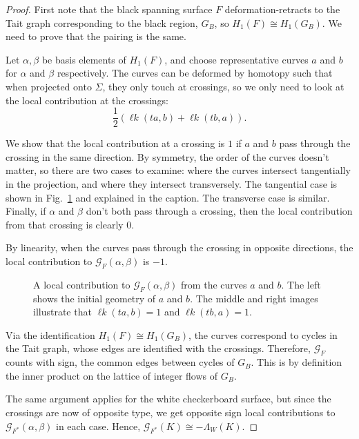 \documentclass[12pt]{report}
\newcommand{\lk}{\operatorname{\ell\textit{k}}}
\theoremstyle{upright}
\begin{document}
\begin{proof}
First note that the black spanning surface $F$ deformation-retracts to the Tait graph corresponding to the black region, $G_{B}$, so $H_{1}(F) \cong H_{1}(G_{B})$. We need to prove that the pairing is the same.

Let $\alpha, \beta$ be basis elements of $H_{1}(F)$, and choose representative curves $a$ and $b$ for $\alpha$ and $\beta$ respectively. The curves can be deformed by homotopy such that when projected onto $\Sigma$, they only touch at crossings, so we only need to look at the local contribution at the crossings:
\[\dfrac{1}{2} \left( \lk(t a, b) + \lk(t b, a) \right).\]

We show that the local contribution at a crossing is $1$ if $a$ and $b$ pass through the crossing in the same direction. By symmetry, the order of the curves doesn't matter, so there are two cases to examine: where the curves intersect tangentially in the projection, and where they intersect transversely. The tangential case is shown in Fig.~\ref{fig:gordon-litherland-pairing-example} and explained in the caption. The transverse case is similar. Finally, if $\alpha$ and $\beta$ don't both pass through a crossing, then the local contribution from that crossing is clearly 0.

By linearity, when the curves pass through the crossing in opposite directions, the local contribution to $\mathcal{G}_{F}(\alpha, \beta)$ is $-1$.

\begin{figure}[h!]
	\centering
	\def\svgscale{0.54}
	
	
	\caption{A local contribution to $\mathcal{G}_{F}(\alpha, \beta)$ from the curves $a$ and $b$. The left shows the initial geometry of $a$ and $b$. The middle and right images illustrate that $\lk(ta, b) = 1$ and $\lk(tb, a) = 1$.}
	\label{fig:gordon-litherland-pairing-example}
\end{figure}

Via the identification $H_{1}(F) \cong H_{1}(G_{B})$, the curves correspond to cycles in the Tait graph, whose edges are identified with the crossings. Therefore, $\mathcal{G}_{F}$ counts with sign, the common edges between cycles of $G_{B}$. This is by definition the inner product on the lattice of integer flows of $G_{B}$.

The same argument applies for the white checkerboard surface, but since the crossings are now of opposite type, we get opposite sign local contributions to $\mathcal{G}_{F^{*}}(\alpha, \beta)$ in each case. Hence, $\mathcal{G}_{F^{*}}(K) \cong -\Lambda_{W}(K)$.
\end{proof}
\end{document}
